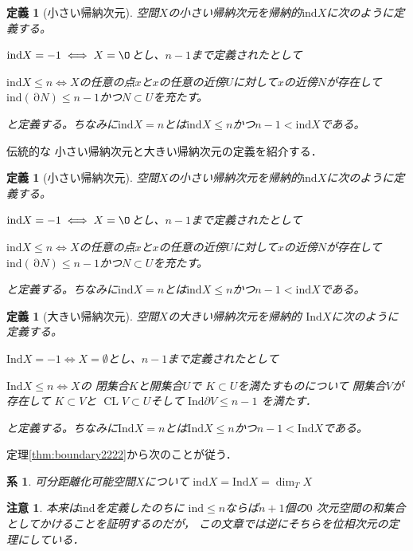 \documentclass[leqno, a4paper, 12pt]{jsarticle}
\newtheorem{cor}[thm]{系}
\newtheorem{df}[thm]{定義}
\newtheorem*{rmk}{注意}
\DeclareMathOperator{\bd}{\partial}
\DeclareMathOperator{\cl}{CL}
\newcommand{\ind}{\mathrm{ind}}
\newcommand{\lind}{\mathrm{Ind}}
\numberwithin{equation}{section}
\begin{document}
\begin{df}[小さい帰納次元]
空間$X$の小さい帰納次元を帰納的$\ind X$に次のように定義する。\par
$\ind X=-1\iff X=\O$とし、$n-1$まで定義されたとして\par
$\ind X\le n\iff$$X$の任意の点$x$と$x$の任意の近傍$U$に対して$x$の近傍$N$が存在して$\ind (\bd N)\le n-1$かつ$N\subset U$を充たす。\par
と定義する。ちなみに$\ind X=n$とは$\ind X\le n$かつ$n-1<\ind X$である。
\end{df}

伝統的な
小さい帰納次元と大きい帰納次元の定義を紹介する．
\begin{df}[小さい帰納次元]
空間$X$の小さい帰納次元を帰納的$\ind X$に次のように定義する。\par
$\ind X=-1\iff X=\O$とし、$n-1$まで定義されたとして\par
$\ind X\le n\iff$$X$の任意の点$x$と$x$の任意の近傍$U$に対して$x$の近傍$N$が存在して
$\ind (\bd N)\le n-1$かつ$N\subset U$を充たす。\par
と定義する。ちなみに$\ind X=n$とは$\ind X\le n$かつ$n-1<\ind X$である。
\end{df}
\begin{df}[大きい帰納次元]
空間$X$の大きい帰納次元を帰納的
$\lind X$に次のように定義する。\par
$\lind X=-1\iff X=\emptyset$とし、$n-1$まで定義されたとして\par
$\lind X\le n\iff$$X$の
閉集合$K$と開集合$U$で
$K\subset U$を満たすものについて
開集合$V$が存在して
$K\subset V$と
$\cl V\subset U$そして
$\lind\partial V\le n-1$
を満たす．
\par
と定義する。ちなみに$\lind X=n$とは$\lind X\le n$かつ$n-1<\lind X$である。
\end{df}


定理\ref{thm:boundary2222}から次のことが従う．
\begin{cor}\label{cor:inddim}
可分距離化可能空間$X$について
$\ind X=\lind X=\dim_{T}X$
\end{cor}

\begin{rmk}
本来は$\ind$を定義したのちに
$\ind \le n$ならば$n+1$個の$0$
次元空間の和集合としてかけることを証明するのだが，
この文章では逆にそちらを位相次元の定理にしている．
\end{rmk}
\end{document}
